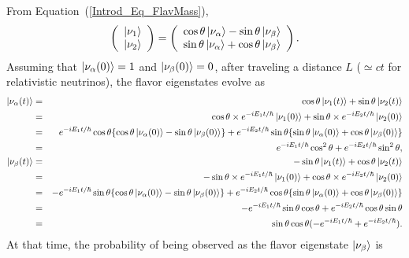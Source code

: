 From Equation~(\ref{Introd_Eq_FlavMass}),
\begin{eqnarray}\label{Introd_Eq_MassFlav}
	\left(
	\begin{array}{c}
		\ket{\nu_{1}} \\
		\ket{\nu_{2}}
	\end{array}
	\right)
	= \left(
	\begin{array}{c}
		\cos\theta\ket{\nu_{\alpha}}-\sin\theta\ket{\nu_{\beta}} \\
		\sin\theta\ket{\nu_{\alpha}}+\cos\theta\ket{\nu_{\beta}}
	\end{array}
	\right).
\end{eqnarray}
Assuming that $\ket{\nu_{\alpha}(0)} = 1$ and $\ket{\nu_{\beta}(0)} = 0$, after traveling a distance $L$ ($\simeq ct$ for relativistic neutrinos), the flavor eigenstates evolve as
\begin{eqnarray}
	\ket{\nu_{\alpha}(t)} &=& \cos\theta\ket{\nu_{1}(t)} + \sin\theta\ket{\nu_{2}(t)} \nonumber \\
	                      &=& \cos\theta \times e^{-iE_{1}t/\hbar}\ket{\nu_{1}(0)} + \sin\theta \times e^{-iE_{2}t/\hbar}\ket{\nu_{2}(0)} \nonumber \\
	                      &=& e^{-iE_{1}t/\hbar}\cos\theta\{\cos\theta\ket{\nu_{\alpha}(0)} - \sin\theta\ket{\nu_{\beta}(0)}\} + e^{-iE_{2}t/\hbar}\sin\theta\{\sin\theta\ket{\nu_{\alpha}(0)} + \cos\theta\ket{\nu_{\beta}(0)}\} \nonumber \\
	                      &=& e^{-iE_{1}t/\hbar}\cos^{2}\theta + e^{-iE_{2}t/\hbar}\sin^{2}\theta, \\
	\ket{\nu_{\beta}(t)}  &=& -\sin\theta\ket{\nu_{1}(t)} + \cos\theta\ket{\nu_{2}(t)} \nonumber \\
	                      &=& -\sin\theta \times e^{-iE_{1}t/\hbar}\ket{\nu_{1}(0)} + \cos\theta \times e^{-iE_{2}t/\hbar}\ket{\nu_{2}(0)} \nonumber \\
	                      &=& -e^{-iE_{1}t/\hbar}\sin\theta\{\cos\theta\ket{\nu_{\alpha}(0)} - \sin\theta\ket{\nu_{\beta}(0)}\} + e^{-iE_{2}t/\hbar}\cos\theta\{\sin\theta\ket{\nu_{\alpha}(0)} + \cos\theta\ket{\nu_{\beta}(0)}\} \nonumber \\
	                      &=& -e^{-iE_{1}t/\hbar}\sin\theta\cos\theta + e^{-iE_{2}t/\hbar}\cos\theta\sin\theta \nonumber \\
	                      &=& \sin\theta\cos\theta(-e^{-iE_{1}t/\hbar} + e^{-iE_{2}t/\hbar}).
\end{eqnarray}
At that time, the probability of being observed as the flavor eigenstate $\ket{\nu_{\beta}}$ is
